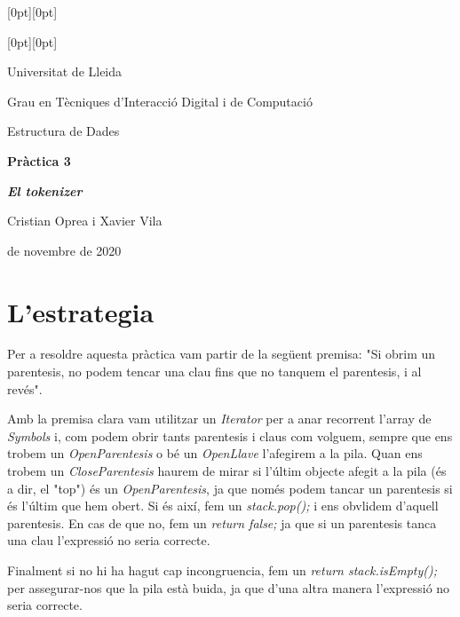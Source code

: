 \documentclass[a4paper, 12pt]{article}
\begin{document}
\begin{titlepage}

\raisebox{-0.2em}[0pt][0pt]{%
}

\raisebox{1.9em}[0pt][0pt]{%
}

    \centering
    {\Large
    Universitat de Lleida\par
    Grau en Tècniques d'Interacció Digital i de Computació\par
    Estructura de Dades\par
}
    \vfill
    {\Huge\bfseries Pràctica 3\par}\vspace{3ex}
    {\Large\bfseries \textit{El tokenizer}\par}
\vspace{6ex}
{\Large
Cristian Oprea i Xavier Vila
\par}
\vfill
\parbox{.5\textwidth}{ de novembre de 2020}
\end{titlepage}

\section{L'estrategia}
Per a resoldre aquesta pràctica vam partir de la següent premisa: "Si obrim un parentesis, no podem tencar una clau fins que no tanquem el parentesis, i al revés".

Amb la premisa clara vam utilitzar un \textit{Iterator} per a anar recorrent l'array de \textit{Symbols} i, com podem obrir tants parentesis i claus com volguem, sempre que ens trobem un \textit{OpenParentesis} o bé un \textit{OpenLlave} l'afegirem a la pila.
Quan ens trobem un \textit{CloseParentesis} haurem de mirar si l'últim objecte afegit a la pila (és a dir, el "top") és un \textit{OpenParentesis}, ja que només podem tancar un parentesis si és l'últim que hem obert.
Si és així, fem un \textit{stack.pop();} i ens obvlidem d'aquell parentesis.
En cas de que no, fem un \textit{return false;} ja que si un parentesis tanca una clau l'expressió no seria correcte.

Finalment si no hi ha hagut cap incongruencia, fem un \textit{return stack.isEmpty();} per assegurar-nos que la pila està buida, ja que d'una altra manera l'expressió no seria correcte.
\end{document}
